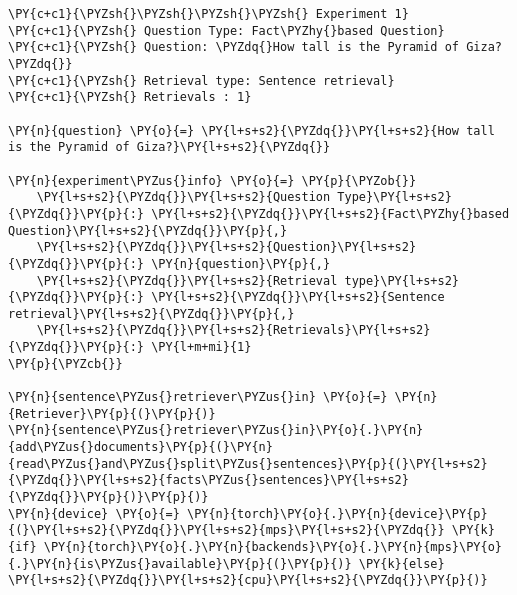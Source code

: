 \documentclass[11pt]{wseas}
\begin{document}
    \begin{tcolorbox}[breakable, size=fbox, boxrule=1pt, pad at break*=1mm,colback=cellbackground, colframe=cellborder]
\begin{Verbatim}[commandchars=\\\{\}]
\PY{c+c1}{\PYZsh{}\PYZsh{}\PYZsh{}\PYZsh{} Experiment 1}
\PY{c+c1}{\PYZsh{} Question Type: Fact\PYZhy{}based Question}
\PY{c+c1}{\PYZsh{} Question: \PYZdq{}How tall is the Pyramid of Giza?\PYZdq{}}
\PY{c+c1}{\PYZsh{} Retrieval type: Sentence retrieval}
\PY{c+c1}{\PYZsh{} Retrievals : 1}

\PY{n}{question} \PY{o}{=} \PY{l+s+s2}{\PYZdq{}}\PY{l+s+s2}{How tall is the Pyramid of Giza?}\PY{l+s+s2}{\PYZdq{}}

\PY{n}{experiment\PYZus{}info} \PY{o}{=} \PY{p}{\PYZob{}}
    \PY{l+s+s2}{\PYZdq{}}\PY{l+s+s2}{Question Type}\PY{l+s+s2}{\PYZdq{}}\PY{p}{:} \PY{l+s+s2}{\PYZdq{}}\PY{l+s+s2}{Fact\PYZhy{}based Question}\PY{l+s+s2}{\PYZdq{}}\PY{p}{,}
    \PY{l+s+s2}{\PYZdq{}}\PY{l+s+s2}{Question}\PY{l+s+s2}{\PYZdq{}}\PY{p}{:} \PY{n}{question}\PY{p}{,}
    \PY{l+s+s2}{\PYZdq{}}\PY{l+s+s2}{Retrieval type}\PY{l+s+s2}{\PYZdq{}}\PY{p}{:} \PY{l+s+s2}{\PYZdq{}}\PY{l+s+s2}{Sentence retrieval}\PY{l+s+s2}{\PYZdq{}}\PY{p}{,}
    \PY{l+s+s2}{\PYZdq{}}\PY{l+s+s2}{Retrievals}\PY{l+s+s2}{\PYZdq{}}\PY{p}{:} \PY{l+m+mi}{1}
\PY{p}{\PYZcb{}}

\PY{n}{sentence\PYZus{}retriever\PYZus{}in} \PY{o}{=} \PY{n}{Retriever}\PY{p}{(}\PY{p}{)}
\PY{n}{sentence\PYZus{}retriever\PYZus{}in}\PY{o}{.}\PY{n}{add\PYZus{}documents}\PY{p}{(}\PY{n}{read\PYZus{}and\PYZus{}split\PYZus{}sentences}\PY{p}{(}\PY{l+s+s2}{\PYZdq{}}\PY{l+s+s2}{facts\PYZus{}sentences}\PY{l+s+s2}{\PYZdq{}}\PY{p}{)}\PY{p}{)}
\PY{n}{device} \PY{o}{=} \PY{n}{torch}\PY{o}{.}\PY{n}{device}\PY{p}{(}\PY{l+s+s2}{\PYZdq{}}\PY{l+s+s2}{mps}\PY{l+s+s2}{\PYZdq{}} \PY{k}{if} \PY{n}{torch}\PY{o}{.}\PY{n}{backends}\PY{o}{.}\PY{n}{mps}\PY{o}{.}\PY{n}{is\PYZus{}available}\PY{p}{(}\PY{p}{)} \PY{k}{else} \PY{l+s+s2}{\PYZdq{}}\PY{l+s+s2}{cpu}\PY{l+s+s2}{\PYZdq{}}\PY{p}{)}


\end{Verbatim}
\end{tcolorbox}
\end{document}
